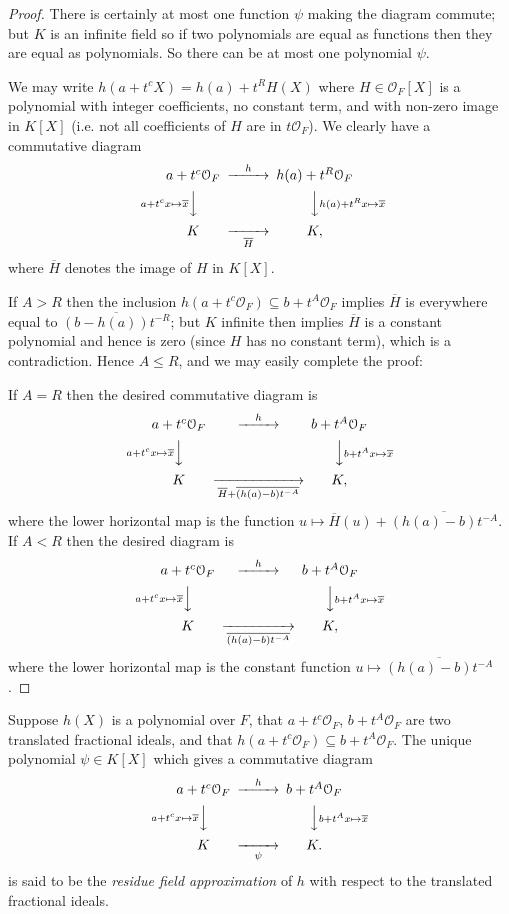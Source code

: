 \documentclass{lmsMODIFIED}
\newcommand{\roi}{\mathcal{O}}
\newcommand{\res}[1]{\overline{#1}}
\begin{document}
\begin{proof}
There is certainly at most one function $\psi$ making the diagram commute; but $ K $ is an infinite field so if two polynomials are equal as functions then they are equal as polynomials. So there can be at most one polynomial $\psi$.

We may write $h(a+t^cX)=h(a)+t^RH(X)$ where $H\in\roi_{F}[X]$ is a polynomial with integer coefficients, no constant term, and with non-zero image in $ K [X]$ (i.e. not all coefficients of $H$ are in $t\roi_{F}$). We clearly have a commutative diagram
\[\begin{CD}
a+t^c\roi_{F} @>h>> h(a)+t^R\roi_{F} \\
@V{a+t^c x\mapsto\res{x}}VV  @VV{h(a)+t^Rx\mapsto\res{x}}V  \\
 K  @>>\res{H}>  K ,\\
\end{CD}\]
where $\res{H}$ denotes the image of $H$ in $ K [X]$.

If $A>R$ then the inclusion $h(a+t^c\roi_{F})\subseteq b+t^A\roi_{F}$ implies $\res{H}$ is everywhere equal to $\res{(b-h(a))t^{-R}}$; but $ K $ infinite then implies $\res{H}$ is a constant polynomial and hence is zero (since $H$ has no constant term), which is a contradiction. Hence $A\le R$, and we may easily complete the proof:

If $A=R$ then the desired commutative diagram is
\[\begin{CD}
a+t^c\roi_{F} @>h>> b+t^A\roi_{F} \\
@V{a+t^c x\mapsto\res{x}}VV  @VV{b+t^Ax\mapsto\res{x}}V  \\
 K  @>>\res{H}+\res{(h(a)-b)t^{-A}}>  K ,\\
\end{CD}\]
where the lower horizontal map is the function $u\mapsto\res{H}(u)+\res{(h(a)-b)t^{-A}}$. If $A<R$ then the desired diagram is
\[\begin{CD}
a+t^c\roi_{F} @>h>> b+t^A\roi_{F} \\
@V{a+t^c x\mapsto\res{x}}VV  @VV{b+t^Ax\mapsto\res{x}}V  \\
 K  @>>\res{(h(a)-b)t^{-A}}>  K ,\\
\end{CD}\]
where the lower horizontal map is the constant function $u\mapsto\res{(h(a)-b)t^{-A}}$.
\end{proof}

\begin{definition}
Suppose $h(X)$ is a polynomial over $F$, that $a+t^c\roi_{F}$, $b+t^A\roi_{F}$ are two translated fractional ideals, and that $h(a+t^c\roi_{F})\subseteq b+t^A\roi_{F}$. The unique polynomial $\psi\in K [X]$ which gives a commutative diagram
\[\begin{CD}
a+t^c\roi_{F} @>h>> b+t^A\roi_{F} \\
@V{a+t^c x\mapsto\res{x}}VV  @VV{b+t^Ax\mapsto\res{x}}V  \\
 K  @>>\psi>  K .\\
\end{CD}\]
is said to be the \emph{residue field approximation} of $h$ with respect to the translated fractional ideals.
\end{definition}
\end{document}
